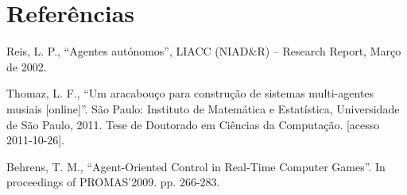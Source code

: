 \documentclass{article}
\begin{document}
\section{Referências}

Reis, L. P., “Agentes autónomos”, LIACC (NIAD\&R) – Research Report, Março de
2002.

Thomaz, L. F., “Um aracabouço para construção de sistemas multi-agentes musiais
[online]”. São Paulo: Instituto de Matemática e Estatística, Universidade de São
Paulo, 2011. Tese de Doutorado em Ciências da Computação. [acesso 2011-10-26].

Behrens, T. M., “Agent-Oriented Control in Real-Time Computer Games”. In
proceedings of PROMAS’2009. pp. 266-283.
\end{document}
